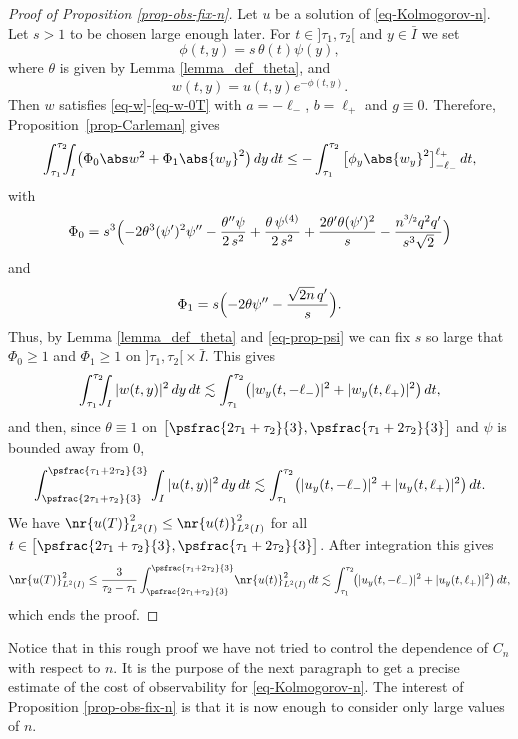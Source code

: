\begin{proof}[Proof of Proposition \ref{prop-obs-fix-n}]
Let $u$ be a solution of \eqref{eq-Kolmogorov-n}. Let $s >1$ to be chosen large enough later. For $t \in{}]\tau_1,\tau_2[$ and $y \in \bar I$ we set
\[
\phi(t,y) = s \, \theta(t) \psi (y),
\]
where $\theta$ is given by Lemma \ref{lemma_def_theta}, and
\[
w(t,y) = u(t,y) e^{-\phi(t,y)}.
\]
Then $w$ satisfies \eqref{eq-w}-\eqref{eq-w-0T} with $a = -\ell_-$, $b = \ell_+$ and $g \equiv 0$. Therefore,
Proposition~\ref{prop-Carleman} gives
\[
\int_{\tau_1}^{\tau_2}\hspace*{-2mm} \int_I \bigl(\Phi_0 \abs w^2 + \Phi_1 \abs{w_y}^2 \bigr) \, dy \, dt
\leq - \int_{\tau_1}^{\tau_2} \big[ \phi_y \abs{w_y}^2 \big]_{-\ell_-}^{\ell_+} \, dt,
\]
with
\begin{equation} \label{eq_Phi0_fixedn}
\Phi_0 = s^3 \Bigl(- 2 \theta^3 (\psi')^2 \psi'' - \frac {\theta'' \psi}{2\,s^2} + \frac {\theta\, \psi^{(4)}}{2\,s^2} + \frac{2\theta' \theta (\psi')^2}{s} - \frac{n^{\sfrac{3}{2}}q^2 q'}{s^3\sqrt{2}} \Bigr)
\end{equation}
and
\begin{equation} \label{eq_Phi1_fixedn}
\Phi_1 = s \Bigl(- 2 \theta \psi''- \frac{\sqrt {2n}\, q'}{s}\Bigr).
\end{equation}
Thus, by Lemma \ref{lemma_def_theta} and \eqref{eq-prop-psi} we can fix $s$ so large that $\Phi_0 \geq 1$ and $\Phi_1 \geq 1$ on $]\tau_1,\tau_2[{}\times \bar I$. This gives
\[
\int_{\tau_1}^{\tau_2}\hspace*{-2mm} \int_{I} \vert w(t,y) \vert^2 \, dy\, dt \lesssim \int_{\tau_1}^{\tau_2} \bigl(\vert w_y(t,-\ell_-) \vert^2 + \vert w_y(t,\ell_+) \vert^2 \bigr) \, dt,
\]
and then, since $\theta \equiv 1$ on $\big[\psfrac{2\tau_1 + \tau_2}{3},\psfrac{\tau_1 + 2\tau_2}{3} \big]$ and $\psi$ is bounded away from 0,
\[
\int_{\psfrac{2\tau_1 + \tau_2}{3}}^{\psfrac{\tau_1 + 2\tau_2}{3}} \int_{I} \vert u(t,y) \vert^2 \, dy\, dt \lesssim \int_{\tau_1}^{\tau_2} \bigl(\vert u_y(t,-\ell_-) \vert^2 + \vert u_y(t,\ell_+) \vert^2 \bigr) \, dt.
\]
We have $\nr{u(T)}_{L^2(I)}^2 \leq \nr{u(t)}_{L^2(I)}^2$ for all $t \in \big[\psfrac{2\tau_1 + \tau_2}{3},\psfrac{\tau_1 + 2\tau_2}{3} \big]$. After integration this gives
\[
\nr{u(T)}_{L^2(I)}^2 \leq \frac{3}{\tau_2 - \tau_1} \int_{\psfrac{2\tau_1 + \tau_2}{3}}^{\psfrac{\tau_1 + 2\tau_2}{3}}\! \nr{u(t)}_{L^2(I)}^2 \, dt \lesssim \int_{\tau_1}^{\tau_2}\! \bigl(\vert u_y(t,-\ell_-) \vert^2 + \vert u_y(t,\ell_+) \vert^2 \bigr) \, dt,
\]
which ends the proof.
\end{proof}

Notice that in this rough proof we have not tried to control the dependence of $C_n$ with respect to $n$. It is the purpose of the next paragraph to get a precise estimate of the cost of observability for \eqref{eq-Kolmogorov-n}. The interest of Proposition \ref{prop-obs-fix-n} is that it is now enough to consider only large values of $n$.

